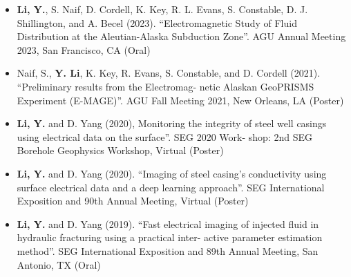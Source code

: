 

\begin{cvparagraph}

  \fontsize{11pt}{1.3em}\selectfont
  \begin{itemize}[leftmargin=2.5ex]
    \item {\textbf{Li, Y.}, S. Naif, D. Cordell, K. Key, R. L. Evans, S. Constable, D. J. Shillington, and A. Becel (2023). “Electromagnetic Study
    of Fluid Distribution at the Aleutian-Alaska Subduction Zone”. AGU Annual Meeting 2023, San Francisco, CA (Oral)}
    \item {Naif, S., \textbf{Y. Li}, K. Key, R. Evans, S. Constable, and D. Cordell (2021). “Preliminary results from the Electromag-
    netic Alaskan GeoPRISMS Experiment (E-MAGE)”. AGU Fall Meeting 2021, New Orleans, LA (Poster)}
    \item {\textbf{Li, Y.} and D. Yang (2020), Monitoring the integrity of steel well casings using electrical data on the surface”. SEG 2020 Work-
    shop: 2nd SEG Borehole Geophysics Workshop, Virtual (Poster)}
    \item {\textbf{Li, Y.} and D. Yang (2020). “Imaging of steel casing’s conductivity using surface electrical data and a deep learning
    approach”. SEG International Exposition and 90th Annual Meeting, Virtual (Poster)}
    \item {\textbf{Li, Y.} and D. Yang (2019). “Fast electrical imaging of injected fluid in hydraulic fracturing using a practical inter-
    active parameter estimation method”. SEG International Exposition and 89th Annual Meeting, San Antonio, TX (Oral)}
  \end{itemize}


\end{cvparagraph}
